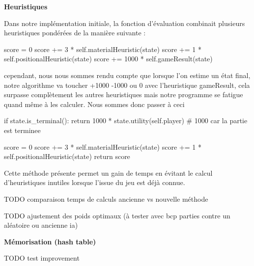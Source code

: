\documentclass[11pt,a4paper]{report}
\begin{document}
\begin{answers}[20cm]

\textbf{Heuristiques}

Dans notre implémentation initiale, la fonction d'évaluation combinait plusieurs heuristiques pondérées de la manière suivante :


score = 0
score += 3 * self.materialHeuristic(state)
score += 1 * self.positionalHeuristic(state)
score += 1000 * self.gameResult(state)



cependant, nous nous sommes rendu compte que lorsque l'on estime un état final, notre algorithme va toucher +1000 -1000 ou 0 avec l'heuristique gameResult, cela surpasse complètement les autres heuristiques mais notre programme se fatigue quand même à les calculer. Nous sommes donc passer à ceci 

if state.is_terminal():
    return 1000 * state.utility(self.player)  # 1000 car la partie est terminee

score = 0
score += 3 * self.materialHeuristic(state)
score += 1 * self.positionalHeuristic(state)
return score


Cette méthode présente permet un gain de temps en évitant le calcul d’heuristiques inutiles lorsque l’issue du jeu est déjà connue.


TODO  comparaison temps de calculs ancienne vs nouvelle méthode

TODO ajustement des poids optimaux (à tester avec bcp parties contre un aléatoire ou ancienne ia)

\textbf{Mémorisation (hash table)}

TODO test improvement

\end{answers}

\begin{answers}[23cm]
\end{answers}

\begin{answers}[23cm]
\end{answers}
\end{document}
